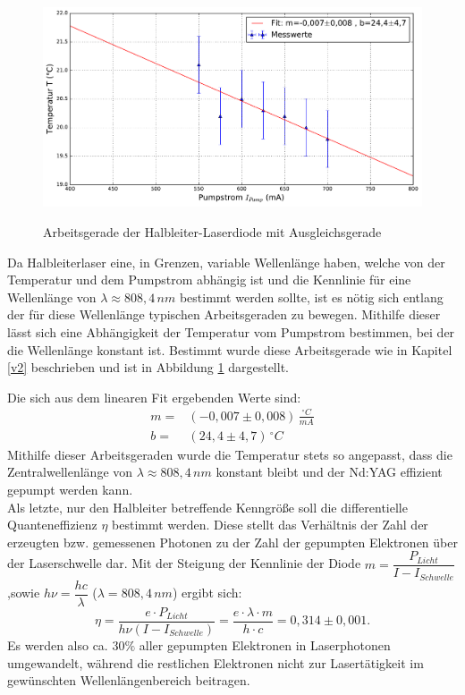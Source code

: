 \documentclass[twoside,colorback,accentcolor=tud4c,11pt]{tudreport}
\begin{document}
\begin{figure}[H]
\centering
   	\begin{minipage}[b]{0.85\textwidth}
   	\includegraphics[width=\textwidth]{graphics/arbeitsgerade_hld.pdf}
  	\label{ad}
   	\end{minipage}
\caption{Arbeitsgerade der Halbleiter-Laserdiode mit Ausgleichsgerade}	
\end{figure}
Da Halbleiterlaser eine, in Grenzen, variable Wellenlänge haben, welche von der Temperatur und dem Pumpstrom abhängig ist und die Kennlinie für eine Wellenlänge von $\lambda\approx 808,4\,\si{nm}$ bestimmt werden sollte, ist es nötig sich entlang der für diese Wellenlänge typischen Arbeitsgeraden zu bewegen. Mithilfe dieser lässt sich eine Abhängigkeit der Temperatur vom Pumpstrom bestimmen, bei der die Wellenlänge konstant ist. Bestimmt wurde diese Arbeitsgerade wie in Kapitel \ref{v2} beschrieben und ist in Abbildung \ref{ad} dargestellt.

Die sich aus dem linearen Fit ergebenden Werte sind:
\begin{align}
m=&(-0,007 \pm 0,008)\,\si{\frac{^{\circ} C}{mA}}\\
b=&(24,4 \pm 4,7)\,\si{^{\circ} C}
\end{align}
Mithilfe dieser Arbeitsgeraden wurde die Temperatur stets so angepasst, dass die Zentralwellenlänge von $\lambda\approx 808,4\,\si{nm}$ konstant bleibt und der Nd:YAG effizient gepumpt werden kann.\\
Als letzte, nur den Halbleiter betreffende Kenngröße soll die differentielle Quanteneffizienz $\eta$ bestimmt werden. Diese stellt das Verhältnis der Zahl der erzeugten bzw. gemessenen Photonen zu der Zahl der gepumpten Elektronen über der Laserschwelle dar. Mit der Steigung der Kennlinie der Diode $m=\dfrac{P_{Licht}}{I-I_{Schwelle}}$,sowie $h\nu=\dfrac{hc}{\lambda}$ ($\lambda=808,4\,\si{nm}$) ergibt sich:
\begin{equation}
\eta=\frac{e\cdot P_{Licht}}{h\nu (I-I_{Schwelle})}=\frac{e\cdot\lambda\cdot m}{h\cdot c}=0,314 \pm 0,001.
\end{equation}
Es werden also ca. $30\%$ aller gepumpten Elektronen in Laserphotonen umgewandelt, während die restlichen Elektronen nicht zur Lasertätigkeit im gewünschten Wellenlängenbereich beitragen.
\end{document}
